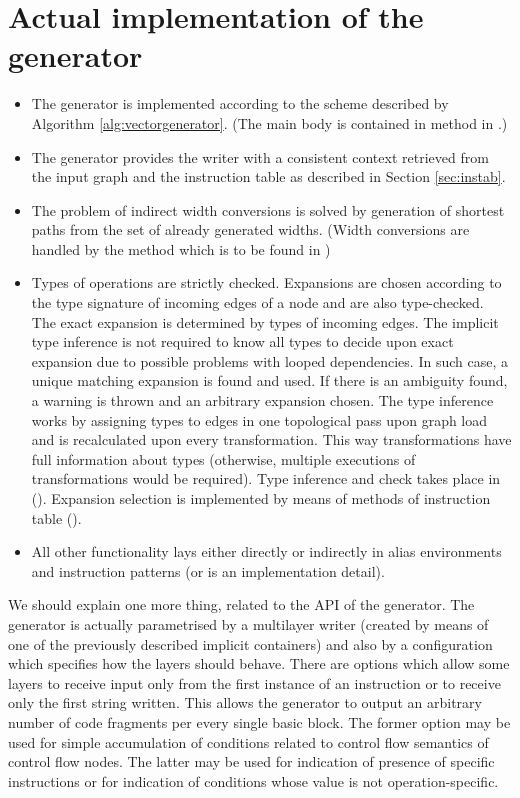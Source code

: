 \section{Actual implementation of the generator}

\begin{itemize}
  \item The generator is implemented according to the scheme described by Algorithm \ref{alg:vectorgenerator}. (The main body is contained in  method in .)
  \item The generator provides the writer with a consistent context retrieved from the input graph and the instruction table as described in Section \ref{sec:instab}. 
  \item The problem of indirect width conversions is solved by generation of shortest paths from the set of already generated widths. (Width conversions are handled by the  method which is to be found in )
  \item Types of operations are strictly checked. Expansions are chosen according to the type signature of incoming edges of a node and are also type-checked. The exact expansion is determined by types of incoming edges. The implicit type inference is not required to know all types to decide upon exact expansion due to possible problems with looped dependencies. In such case, a unique matching expansion is found and used. If there is an ambiguity found, a warning is thrown and an arbitrary expansion chosen. The type inference works by assigning types to edges in one topological pass upon graph load and is recalculated upon every transformation. This way transformations have full information about types (otherwise, multiple executions of transformations would be required). Type inference and check takes place in  (). Expansion selection is implemented by means of  methods of instruction table ().
  \item All other functionality lays either directly or indirectly in alias environments and instruction patterns (or is an implementation detail).
\end{itemize}

We should explain one more thing, related to the API of the generator. The generator is actually parametrised by a multilayer writer (created by means of one of the previously described implicit containers) and also by a configuration which specifies how the layers should behave. There are options which allow some layers to receive input only from the first instance of an instruction or to receive only the first string written. This allows the generator to output an arbitrary number of code fragments per every single basic block. The former option may be used for simple accumulation of conditions related to control flow semantics of control flow nodes. The latter may be used for indication of presence of specific instructions or for indication of conditions whose value is not operation-specific.


